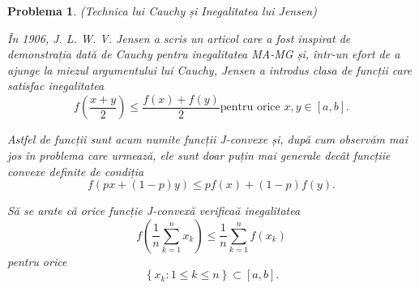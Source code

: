 \documentclass[a4paper,12pt,oneside]{report}
\newtheorem{problem}{Problema}
\begin{document}
\begin{problem} (Technica lui Cauchy și Inegalitatea lui Jensen)

În 1906, J. L. W. V. Jensen a scris un articol care a fost inspirat de demonstrația dată de Cauchy pentru inegalitatea MA-MG și, într-un efort de a ajunge la miezul argumentului lui Cauchy, Jensen a introdus clasa de funcții care satisfac inegalitatea
\begin{displaymath}
  f\left ( \frac{x + y}{2} \right ) \leq \frac{f\left ( x \right ) + f\left ( y \right )}{2} \text{pentru orice } x,y \in \left [ a, b \right ]. \label{eq:2.14} \tag{2.14}
\end{displaymath}

Astfel de funcții sunt acum numite funcții J-convexe și, după cum observăm mai jos în problema care urmează, ele sunt doar puțin mai generale decât funcțiie convexe definite de condiția
\begin{displaymath}
  f\left ( px + \left ( 1 - p \right )y \right )\leq pf\left ( x \right ) + \left ( 1-p \right )f\left ( y \right ).
\end{displaymath}

Să se arate că orice funcție  J-convexă verificaă inegalitatea
\begin{displaymath}
  f\left ( \frac{1}{n} \sum_{k = 1}^{n}x_{k}\right )\leq \frac{1}{n}\sum_{k = 1}^{n}f\left ( x_{k} \right )
\end{displaymath}
pentru orice
\begin{displaymath}
  \left \{ x_{k}: 1\leq k \leq n \right \} \subset \left [ a, b \right ]. \label{eq:2.15} \tag{2.15}
\end{displaymath}
\end{problem}
\end{document}
